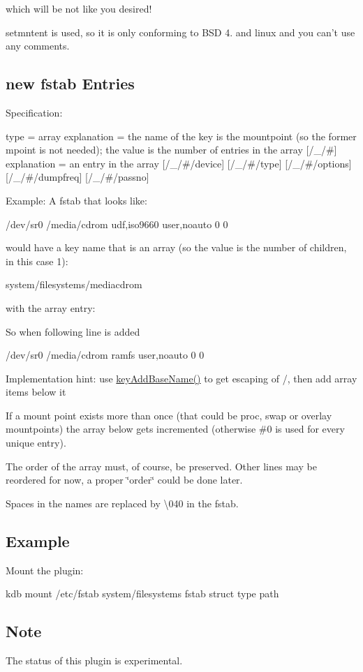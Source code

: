 which will be not like you desired!

setmntent is used, so it is only conforming to B\+S\+D 4. and linux and you can't use any comments.

\subsection*{new fstab Entries}

Specification\+: \begin{DoxyVerb}[/_]
type = array
explanation = the name of the key is the mountpoint (so the former
  mpoint is not needed); the value is the number of entries in the
  array
[/_/#]
explanation = an entry in the array
[/_/#/device]
[/_/#/type]
[/_/#/options]
[/_/#/dumpfreq]
[/_/#/passno]
\end{DoxyVerb}


Example\+: A fstab that looks like\+: \begin{DoxyVerb}/dev/sr0        /media/cdrom   udf,iso9660 user,noauto     0       0
\end{DoxyVerb}


would have a key name that is an array (so the value is the number of children, in this case 1)\+: \begin{DoxyVerb}system/filesystems/\/media\/cdrom
\end{DoxyVerb}


with the array entry\+: 


So when following line is added \begin{DoxyVerb}/dev/sr0        /media/cdrom   ramfs user,noauto     0       0
\end{DoxyVerb}


Implementation hint\+: use \hyperlink{group__keyname_gaa942091fc4bd5c2699e49ddc50829524}{key\+Add\+Base\+Name()} to get escaping of /, then add array items below it

If a mount point exists more than once (that could be proc, swap or overlay mountpoints) the array below gets incremented (otherwise \#0 is used for every unique entry).

The order of the array must, of course, be preserved. Other lines may be reordered for now, a proper \char`\"{}order\char`\"{} could be done later.

Spaces in the names are replaced by \textbackslash{}040 in the fstab.

\subsection*{Example}

Mount the plugin\+: \begin{DoxyVerb}    kdb mount /etc/fstab system/filesystems fstab struct type path
\end{DoxyVerb}


\subsection*{Note}

The status of this plugin is experimental. 